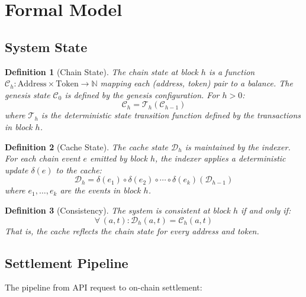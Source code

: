 \documentclass[11pt,a4paper]{article}
\newtheorem{definition}{Definition}[section]
\begin{document}
\section{Formal Model}
\label{sec:model}

\subsection{System State}

\begin{definition}[Chain State]
The chain state at block $h$ is a function
$\mathcal{C}_h : \text{Address} \times \text{Token} \rightarrow
\mathbb{N}$ mapping each (address, token) pair to a balance.
The genesis state $\mathcal{C}_0$ is defined by the genesis
configuration.  For $h > 0$:
\[
  \mathcal{C}_h = \mathcal{T}_h(\mathcal{C}_{h-1})
\]
where $\mathcal{T}_h$ is the deterministic state transition function
defined by the transactions in block $h$.
\end{definition}

\begin{definition}[Cache State]
The cache state $\mathcal{D}_h$ is maintained by the indexer.  For
each chain event $e$ emitted by block $h$, the indexer applies a
deterministic update $\delta(e)$ to the cache:
\[
  \mathcal{D}_h = \delta(e_1) \circ \delta(e_2) \circ \cdots \circ
  \delta(e_k)(\mathcal{D}_{h-1})
\]
where $e_1, \ldots, e_k$ are the events in block $h$.
\end{definition}

\begin{definition}[Consistency]
The system is \emph{consistent at block $h$} if and only if:
\[
  \forall \, (a, t) : \mathcal{D}_h(a, t) = \mathcal{C}_h(a, t)
\]
That is, the cache reflects the chain state for every address and
token.
\end{definition}

\subsection{Settlement Pipeline}

The pipeline from API request to on-chain settlement:
\end{document}
